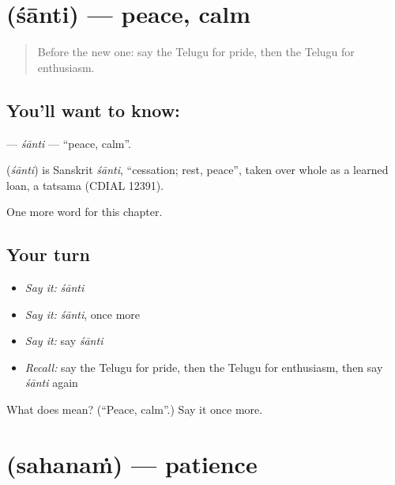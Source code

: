 \section[\texorpdfstring{\te{శాంతి} (śānti)}{శాంతి (śānti)}]{ (śānti) — peace, calm}

\label{lesson:TE-C168-santi}



\begin{quote}
Before the new one: say the Telugu for pride, then the Telugu for enthusiasm.
\end{quote}

\subsection*{You'll want to know: }
\textbf{} — \emph{śānti} — \textquotedblleft{}peace, calm\textquotedblright{}.

\begin{cousinweb}
\textbf{} (\emph{śānti}) is Sanskrit \emph{śānti}, \textquotedblleft{}cessation; rest, peace\textquotedblright{}, taken over whole as a learned loan, a tatsama (CDIAL 12391).
\end{cousinweb}

\begin{grammarlens}[title={What you've built}]
One more word for this chapter.
\end{grammarlens}

\subsection*{Your turn}
\begin{itemize}
\raggedright
  \item \emph{Say it:} \emph{śānti}
  \item \emph{Say it:} \emph{śānti}, once more
  \item \emph{Say it:} say \emph{śānti}
  \item \emph{Recall:} say the Telugu for pride, then the Telugu for enthusiasm, then say \emph{śānti} again
\end{itemize}

\begin{tcolorbox}[breakable,colback=teal!4,colframe=teal!35!black,title={Before you move on}]
What does  mean? (\textquotedblleft{}Peace, calm\textquotedblright{}.) Say it once more.
\end{tcolorbox}
\section[\texorpdfstring{\te{సహనం} (sahanaṁ)}{సహనం (sahanaṁ)}]{ (sahanaṁ) — patience}

